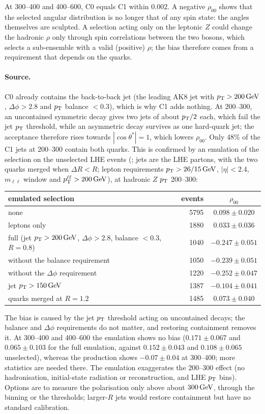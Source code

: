 At 300--400 and 400--600\GeV, C0 equals C1 within $0.002$. A negative $\rho_{00}$ shows that the selected angular
distribution is no longer that of any spin state: the angles themselves are sculpted. A selection acting only on the
leptonic $Z$ could change the hadronic $\rho$ only through spin correlations between the two bosons, which selects a
sub-ensemble with a valid (positive) $\rho$; the bias therefore comes from a requirement that depends on the quarks.

\paragraph{Source.} C0 already contains the back-to-back jet (the leading AK8 jet with $p_{\mathrm{T}} > 200\,\mathrm{GeV}$, $\Delta\phi >
2.8$ and $p_{\mathrm{T}}$ balance $< 0.3$), which is why C1 adds nothing. At 200--300\GeV, an uncontained symmetric decay gives
two jets of about $p_{\mathrm{T}}/2$ each, which fail the jet $p_{\mathrm{T}}$ threshold, while an asymmetric decay survives as one hard-quark
jet; the acceptance therefore rises towards $|\cos\theta^*| = 1$, which lowers $\rho_{00}$. Only 48\% of the C1 jets at
200--300\GeV{} contain both quarks. This is confirmed by an emulation of the selection on the unselected LHE events
(; jets are the LHE partons, with the two quarks merged when $\Delta R < R$; lepton
requirements $p_{\mathrm{T}} > 26/15\,\mathrm{GeV}$, $|\eta| < 2.4$, $m_{\ell\ell}$ window and $p_{\mathrm{T}}^{\ell\ell} > 200\,\mathrm{GeV}$), at hadronic $Z$ $p_{\mathrm{T}}$
200--300\GeV:
\begin{center}
\small
\begin{tabular}{lrc}
\toprule
emulated selection & events & $\rho_{00}$ \\
\midrule
none & 5795 & $0.098 \pm 0.020$ \\
leptons only & 1880 & $0.033 \pm 0.036$ \\
full (jet $p_{\mathrm{T}} > 200\,\mathrm{GeV}$, $\Delta\phi > 2.8$, balance $< 0.3$, $R = 0.8$) & 1040 & $-0.247 \pm 0.051$ \\
without the balance requirement & 1050 & $-0.239 \pm 0.051$ \\
without the $\Delta\phi$ requirement & 1220 & $-0.252 \pm 0.047$ \\
jet $p_{\mathrm{T}} > 150\,\mathrm{GeV}$ & 1387 & $-0.104 \pm 0.041$ \\
quarks merged at $R = 1.2$ & 1485 & $0.073 \pm 0.040$ \\
\bottomrule
\end{tabular}
\end{center}
The bias is caused by the jet $p_{\mathrm{T}}$ threshold acting on uncontained decays; the balance and $\Delta\phi$ requirements
do not matter, and restoring containment removes it. At 300--400 and 400--600\GeV{} the emulation shows no bias
($0.171 \pm 0.067$ and $0.065 \pm 0.103$ for the full emulation, against $0.152 \pm 0.043$ and $0.108 \pm 0.065$
unselected), whereas the production shows $-0.07 \pm 0.04$ at 300--400\GeV; more statistics are needed there. The
emulation exaggerates the 200--300\GeV{} effect (no hadronisation, initial-state radiation or reconstruction, and LHE
$p_{\mathrm{T}}$ bins). Options are to measure the polarisation only above about $300\,\mathrm{GeV}$, through the binning or the thresholds;
larger-$R$ jets would restore containment but have no standard calibration.

